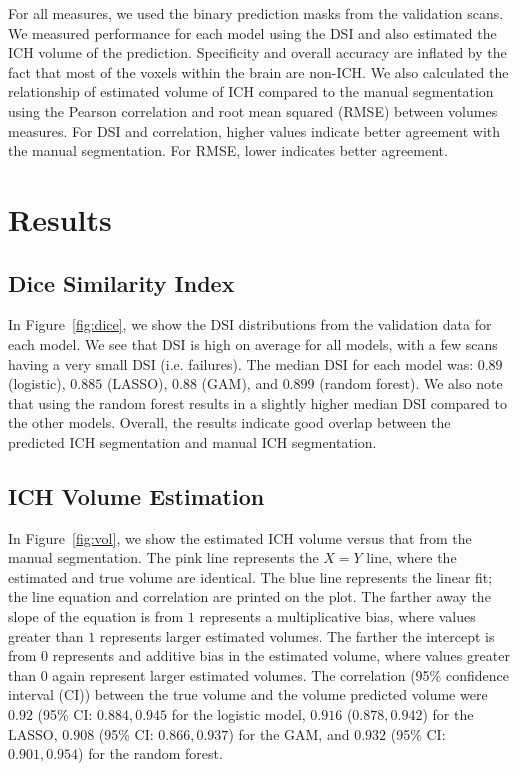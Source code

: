 \documentclass{elsarticle_nonatbib}\usepackage[]{graphicx}\usepackage[]{color}
\begin{document}
For all measures, we used the binary prediction masks from the validation scans.  We measured performance for each model using the DSI and also estimated the ICH volume of the prediction. Specificity and overall accuracy are inflated by the fact that most of the voxels within the brain are non-ICH.  We also calculated the relationship of estimated volume of ICH compared to the manual segmentation using the Pearson correlation and root mean squared (RMSE) between volumes measures. For DSI and correlation, higher values indicate better agreement with the manual segmentation.  For RMSE, lower indicates better agreement.


\section{Results}

\subsection{Dice Similarity Index}

In Figure~\ref{fig:dice}, we show the DSI distributions from the validation data for each model.  We see that DSI is high on average for all models, with a few scans having a very small DSI (i.e. failures).   The median DSI for each model was: $0.89$ (logistic), $0.885$  (LASSO), $0.88$ (GAM), and $0.899$ (random forest). 
We also note that using the random forest results in a slightly higher median DSI compared to the other models.  Overall, the results indicate good overlap between the predicted ICH segmentation and manual ICH segmentation. 





\subsection{ICH Volume Estimation}
In Figure~\ref{fig:vol}, we show the estimated ICH volume versus that from the manual segmentation.  The pink line represents the $X = Y$ line, where the estimated and true volume are identical.  The blue line represents the linear fit; the line equation and correlation are printed on the plot.  The farther away the slope of the equation is from $1$ represents a multiplicative bias, where values greater than $1$ represents larger estimated volumes.  The farther the intercept is from $0$ represents and additive bias in the estimated volume, where values greater than $0$ again represent larger estimated volumes.  The correlation (95\% confidence interval (CI)) between the true volume and the volume predicted volume were $0.92$ (95\% CI: $0.884, 0.945$ for the logistic model, 
$0.916$ ($0.878, 0.942$) for the LASSO, 
$0.908$ (95\% CI: $0.866, 0.937$) for the GAM, and  
$0.932$ (95\% CI: $0.901, 0.954$) for the random forest. 
\end{document}

